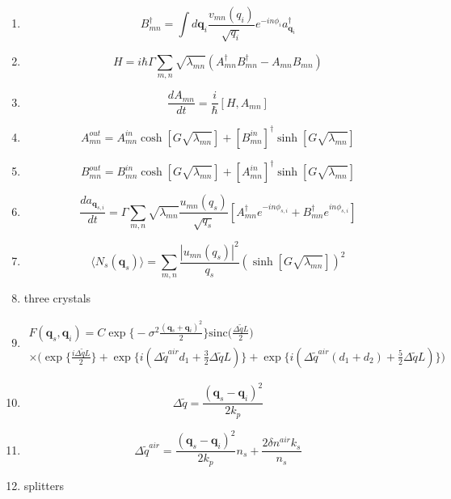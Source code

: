 \documentclass[12pt]{article}
\begin{document}
\begin{enumerate}
\item $$ B_{mn}^{\dag} = \int d\mathbf{q}_{i} \frac{v_{mn}(q_{i})}{\sqrt{q_{i}}} e^{-in\phi_{i}} a_{\mathbf{q}_{i}}^{\dag} $$

\item $$ H = i \hbar \Gamma \sum_{m,n} \sqrt{\lambda_{mn}} (A_{mn}^{\dag} B_{mn}^{\dag} - A_{mn}B_{mn}) $$

\item $$  \frac{dA_{mn}}{dt} = \frac{i}{\hbar}[H,A_{mn}] $$ 

\item $$ A_{mn}^{out} = A_{mn}^{in}\cosh[G\sqrt{\lambda_{mn}}] + [B_{mn}^{in}]^{\dag}\sinh[G\sqrt{\lambda_{mn}}] $$

\item $$ B_{mn}^{out} = B_{mn}^{in}\cosh[G\sqrt{\lambda_{mn}}] + [A_{mn}^{in}]^{\dag}\sinh[G\sqrt{\lambda_{mn}}] $$

\item $$ \frac{d a_{\mathbf{q}_{s,i}}}{dt} = \Gamma \sum_{m,n} \sqrt{\lambda_{mn}} \frac{u_{mn}(q_{s})}{\sqrt{q_{s}}} [A_{mn}^{\dag} e^{-in\phi_{s,i}} + B_{mn}^{\dag} e^{in\phi_{s,i}}  ] $$

\item $$ \langle N_{s}(\mathbf{q}_{s}) \rangle = \sum_{m,n} \frac{|u_{mn}(q_{s})|^{2}}{q_{s}} (\sinh[G\sqrt{\lambda_{mn}}])^{2}  $$

\item three crystals

\item 
\begin{multline} 
 F(\mathbf{q}_{s},\mathbf{q}_{i}) = C\exp\big\{-\sigma^2\frac{(\mathbf{q}_{s} + \mathbf{q}_{i})^2}{2}  \big\} \textrm{sinc}\Big(\frac{\Delta \widetilde{q} L}{2}\Big) \\
 \times \Big( \exp\big\{\frac{i \Delta \widetilde{q} L}{2}\big\} +
 \exp\big\{i(\Delta \widetilde{q}^{air} d_{1} + \frac{3}{2} \Delta \widetilde{q} L) \big\} + 
 \exp\big\{i(\Delta \widetilde{q}^{air} (d_{1} + d_{2}) + \frac{5}{2} \Delta \widetilde{q} L) \big\} 
  \Big) 
\end{multline}

\item $$ \Delta\widetilde{q} = \frac{(\mathbf{q}_{s} - \mathbf{q}_{i})^2}{2k_{p}} $$

\item $$ \Delta\widetilde{q}^{air} = \frac{(\mathbf{q}_{s} - \mathbf{q}_{i})^2}{2k_{p}}n_s + \frac{2\delta n^{air}k_s}{n_s} $$


\item splitters


\end{enumerate}
\end{document}
